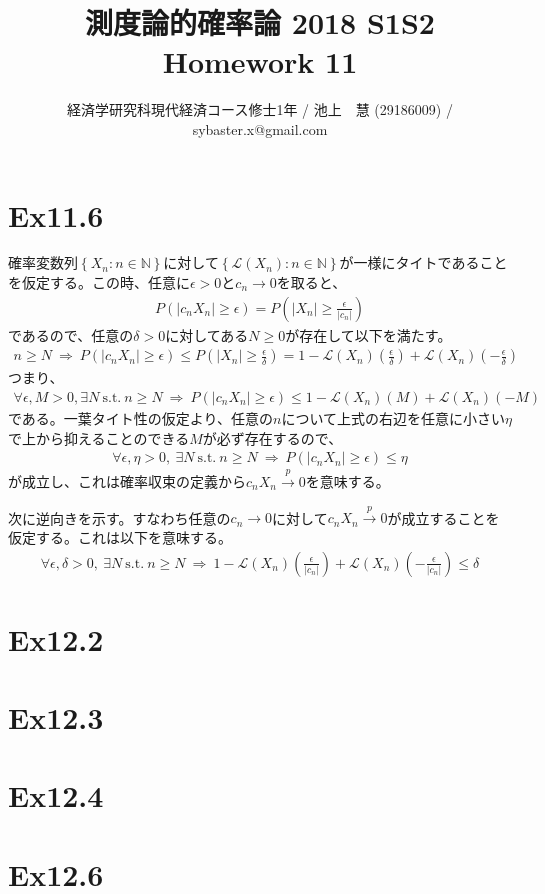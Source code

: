 \documentclass{article}
\begin{document}
\title{測度論的確率論 2018 S1S2 \\ 
Homework 11}
\author{経済学研究科現代経済コース修士1年 / 池上　慧 (29186009) / sybaster.x@gmail.com}
\maketitle


\section{Ex11.6}
確率変数列$\left\{ X_n : n \in \mathbb{N}\right\}$に対して$\left\{ \mathcal{L}(X_n) : n \in \mathbb{N} \right\}$が一様にタイトであることを仮定する。この時、任意に$\epsilon > 0$と$c_n \to 0$を取ると、
\begin{align*}
	P\left( \left| c_n X_n \right| \geq \epsilon \right) = P\left( \left| X_n \right| \geq \frac{\epsilon}{|c_n|} \right)
\end{align*}
であるので、任意の$\delta > 0$に対してある$N \geq 0$が存在して以下を満たす。
\begin{align*}
	n\geq N\ \Rightarrow\ P\left( \left| c_n X_n \right| \geq \epsilon \right) \leq P\left( \left| X_n \right| \geq \frac{\epsilon}{\delta} \right) = 1-\mathcal{L}(X_n)\left( \frac{\epsilon}{\delta} \right) + \mathcal{L}(X_n)\left(- \frac{\epsilon}{\delta} \right)
\end{align*}
つまり、
\begin{align*}
	\forall \epsilon,M > 0, \exists N\ \text{s.t.}\ n\geq N\ \Rightarrow\ P\left( \left| c_n X_n \right| \geq \epsilon \right) \leq 1-\mathcal{L}(X_n)\left( M \right) + \mathcal{L}(X_n)\left(-M \right)
\end{align*}
である。一葉タイト性の仮定より、任意の$n$について上式の右辺を任意に小さい$\eta$で上から抑えることのできる$M$が必ず存在するので、
\begin{align*}
	\forall \epsilon, \eta > 0,\ \exists N\ \text{s.t.}\ n\geq N\ \Rightarrow\ P\left( \left| c_n X_n \right| \geq \epsilon \right) \leq \eta
\end{align*}
が成立し、これは確率収束の定義から$c_nX_n\xrightarrow{p}0$を意味する。

\noindent
次に逆向きを示す。すなわち任意の$c_n \to 0$に対して$c_n X_n \xrightarrow{p} 0$が成立することを仮定する。これは以下を意味する。
\begin{align*}
	\forall \epsilon , \delta > 0,\ \exists N\ \text{s.t.}\ n\geq N\ \Rightarrow\ 1-\mathcal{L}(X_n)\left( \frac{\epsilon}{\left| c_n \right|} \right) + \mathcal{L}(X_n)\left( -\frac{\epsilon}{\left| c_n \right|} \right) \leq \delta
\end{align*}

\section{Ex12.2}

\section{Ex12.3}

\section{Ex12.4}

\section{Ex12.6}
\end{document}
